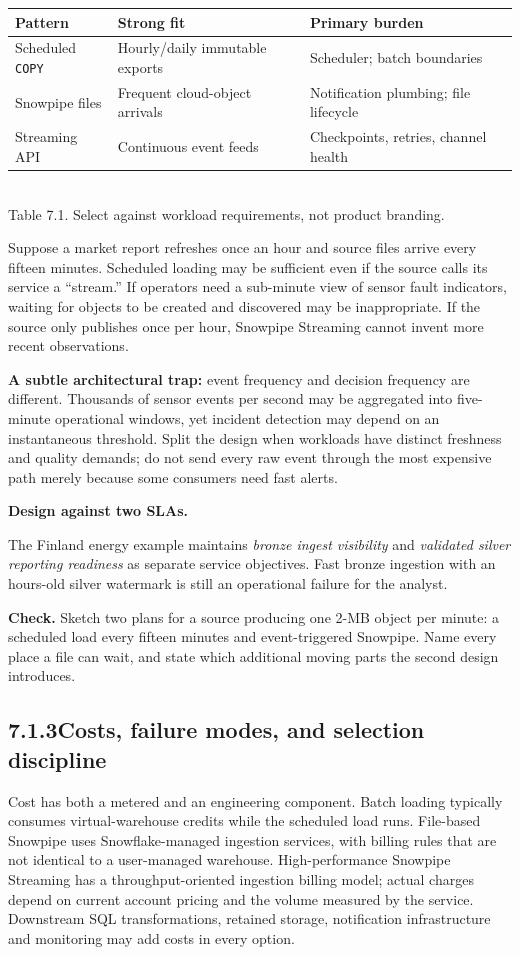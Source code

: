 \documentclass[11pt,twoside]{article}
\newcommand{\topic}[2]{\subsection*{#1\quad #2}}
\begin{document}
\begin{center}\small\renewcommand{\arraystretch}{1.15}\begin{tabularx}{\linewidth}{@{}p{25mm}X X@{}}\toprule
\textbf{Pattern}&\textbf{Strong fit}&\textbf{Primary burden}\\\midrule
Scheduled \texttt{COPY}&Hourly/daily immutable exports&Scheduler; batch boundaries\\
Snowpipe files&Frequent cloud-object arrivals&Notification plumbing; file lifecycle\\
Streaming API&Continuous event feeds&Checkpoints, retries, channel health\\\bottomrule
\end{tabularx}\\{\fontsize{8}{9.6}\selectfont\color{inkgray}Table 7.1. Select against workload requirements, not product branding.}\end{center}
Suppose a market report refreshes once an hour and source files arrive every fifteen minutes. Scheduled loading may be sufficient even if the source calls its service a ``stream.'' If operators need a sub-minute view of sensor fault indicators, waiting for objects to be created and discovered may be inappropriate. If the source only publishes once per hour, Snowpipe Streaming cannot invent more recent observations.

\textbf{A subtle architectural trap:} event frequency and decision frequency are different. Thousands of sensor events per second may be aggregated into five-minute operational windows, yet incident detection may depend on an instantaneous threshold. Split the design when workloads have distinct freshness and quality demands; do not send every raw event through the most expensive path merely because some consumers need fast alerts.
\begin{insight}\textbf{Design against two SLAs.}\par
The Finland energy example maintains \emph{bronze ingest visibility} and \emph{validated silver reporting readiness} as separate service objectives. Fast bronze ingestion with an hours-old silver watermark is still an operational failure for the analyst.\end{insight}
\textbf{Check.} Sketch two plans for a source producing one 2-MB object per minute: a scheduled load every fifteen minutes and event-triggered Snowpipe. Name every place a file can wait, and state which additional moving parts the second design introduces.
\newpage
\topic{7.1.3}{Costs, failure modes, and selection discipline}
Cost has both a metered and an engineering component. Batch loading typically consumes virtual-warehouse credits while the scheduled load runs. File-based Snowpipe uses Snowflake-managed ingestion services, with billing rules that are not identical to a user-managed warehouse. High-performance Snowpipe Streaming has a throughput-oriented ingestion billing model; actual charges depend on current account pricing and the volume measured by the service. Downstream SQL transformations, retained storage, notification infrastructure and monitoring may add costs in every option.
\end{document}
